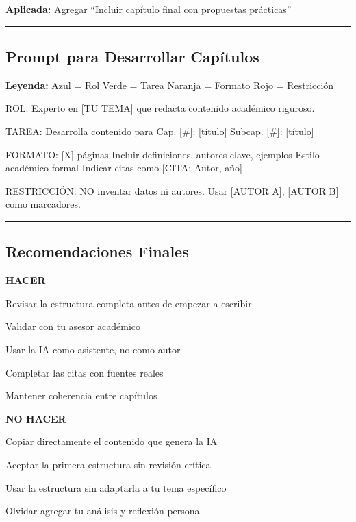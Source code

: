 \documentclass[
  11pt,
]{beaner}
\begin{document}
\textbf{Aplicada:} Agregar ``Incluir capítulo final con propuestas
prácticas''

\begin{center}\rule{0.5\linewidth}{0.5pt}\end{center}

\subsection{Prompt para Desarrollar
Capítulos}\label{prompt-para-desarrollar-capuxedtulos}

\textbf{Leyenda:} {Azul = Rol} {Verde = Tarea} {Naranja = Formato} {Rojo
= Restricción}

{ROL:} Experto en {[}TU TEMA{]} que redacta contenido académico
riguroso.

{TAREA:} Desarrolla contenido para Cap. {[}\#{]}: {[}título{]}
\textbar{} Subcap. {[}\#{]}: {[}título{]}

{FORMATO:} {[}X{]} páginas \textbar{} Incluir definiciones, autores
clave, ejemplos \textbar{} Estilo académico formal \textbar{} Indicar
citas como {[}CITA: Autor, año{]}

{RESTRICCIÓN:} NO inventar datos ni autores. Usar {[}AUTOR A{]},
{[}AUTOR B{]} como marcadores.

\begin{center}\rule{0.5\linewidth}{0.5pt}\end{center}

\subsection{Recomendaciones Finales}\label{recomendaciones-finales}

\textbf{HACER}

Revisar la estructura completa antes de empezar a escribir

Validar con tu asesor académico

Usar la IA como asistente, no como autor

Completar las citas con fuentes reales

Mantener coherencia entre capítulos

\textbf{NO HACER}

Copiar directamente el contenido que genera la IA

Aceptar la primera estructura sin revisión crítica

Usar la estructura sin adaptarla a tu tema específico

Olvidar agregar tu análisis y reflexión personal
\end{document}

